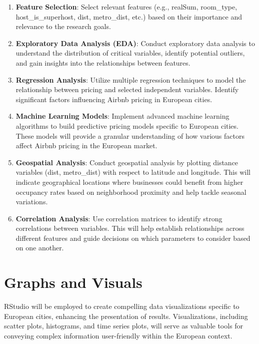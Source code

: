 \documentclass[12pt, letterpaper]{article}
\begin{document}
\begin{enumerate}
  \item \textbf{Feature Selection}: Select relevant features (e.g., realSum, room\_type, host\_is\_superhost, dist, metro\_dist, etc.) based on their importance and relevance to the research goals.
  \item \textbf{Exploratory Data Analysis (EDA)}: Conduct exploratory data analysis to understand the distribution of critical variables, identify potential outliers, and gain insights into the relationships between features.
  \item \textbf{Regression Analysis}: Utilize multiple regression techniques to model the relationship between pricing and selected independent variables. Identify significant factors influencing Airbnb pricing in European cities.
  \item \textbf{Machine Learning Models}: Implement advanced machine learning algorithms to build predictive pricing models specific to European cities. These models will provide a granular understanding of how various factors affect Airbnb pricing in the European market.
  \item \textbf{Geospatial Analysis}: Conduct geospatial analysis by plotting distance variables (dist, metro\_dist) with respect to latitude and longitude. This will indicate geographical locations where businesses could benefit from higher occupancy rates based on neighborhood proximity and help tackle seasonal variations.
  \item \textbf{Correlation Analysis}: Use correlation matrices to identify strong correlations between variables. This will help establish relationships across different features and guide decisions on which parameters to consider based on one another.
\end{enumerate}

\section*{Graphs and Visuals}
RStudio will be employed to create compelling data visualizations specific to European cities, enhancing the presentation of results. Visualizations, including scatter plots, histograms, and time series plots, will serve as valuable tools for conveying complex information user-friendly within the European context.
\end{document}
